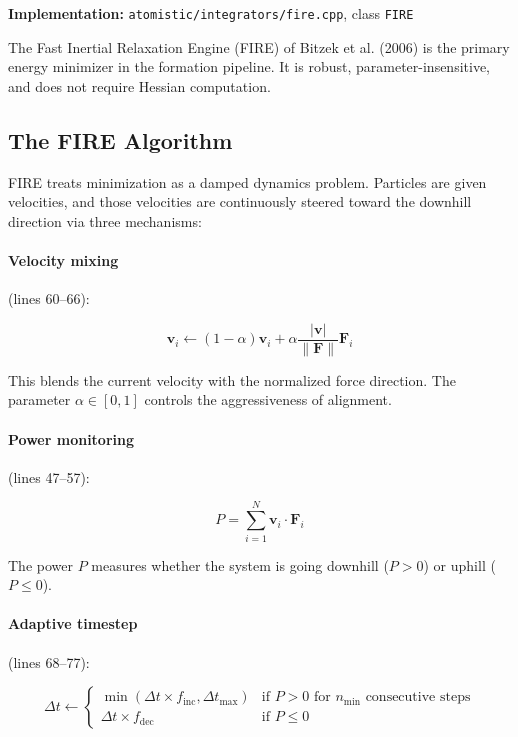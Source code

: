 \documentclass[11pt]{article}
\begin{document}
\textbf{Implementation:} \texttt{atomistic/integrators/fire.cpp}, class \texttt{FIRE}

The Fast Inertial Relaxation Engine (FIRE) of Bitzek et al. (2006) is the primary energy minimizer in the formation pipeline. It is robust, parameter-insensitive, and does not require Hessian computation.

\subsection{The FIRE Algorithm}

FIRE treats minimization as a damped dynamics problem. Particles are given velocities, and those velocities are continuously steered toward the downhill direction via three mechanisms:

\paragraph{Velocity mixing} (lines 60--66):

\begin{equation}
\mathbf{v}_i \gets (1 - \alpha)\mathbf{v}_i + \alpha \frac{|\mathbf{v}|}{\|\mathbf{F}\|} \mathbf{F}_i
\end{equation}

This blends the current velocity with the normalized force direction. The parameter $\alpha \in [0,1]$ controls the aggressiveness of alignment.

\paragraph{Power monitoring} (lines 47--57):

\begin{equation}
P = \sum_{i=1}^{N} \mathbf{v}_i \cdot \mathbf{F}_i
\end{equation}

The power $P$ measures whether the system is going downhill ($P > 0$) or uphill ($P \leq 0$).

\paragraph{Adaptive timestep} (lines 68--77):

\begin{equation}
\Delta t \gets \begin{cases}
\min(\Delta t \times f_{\text{inc}}, \Delta t_{\max}) & \text{if } P > 0 \text{ for } n_{\min} \text{ consecutive steps} \\
\Delta t \times f_{\text{dec}} & \text{if } P \leq 0
\end{cases}
\end{equation}
\end{document}
